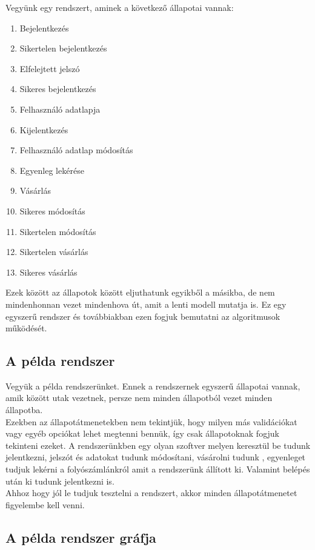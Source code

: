 \documentclass[12pt]{article}
\begin{document}
Vegyünk egy rendszert, aminek a következő állapotai vannak:
\begin{enumerate}
\item Bejelentkezés
\item Sikertelen bejelentkezés
\item Elfelejtett jelszó
\item Sikeres bejelentkezés
\item Felhasználó adatlapja
\item Kijelentkezés
\item Felhasználó adatlap módosítás
\item Egyenleg lekérése
\item Vásárlás
\item Sikeres módosítás
\item Sikertelen módosítás
\item Sikertelen vásárlás
\item Sikeres vásárlás
\end{enumerate}

Ezek között az állapotok között eljuthatunk egyikből a másikba, de nem mindenhonnan vezet mindenhova út, amit a lenti modell mutatja is.
Ez egy egyszerű rendszer és továbbiakban ezen fogjuk bemutatni az algoritmusok működését.\\

\subsection{A példa rendszer}

Vegyük a példa rendszerünket. Ennek a rendszernek egyszerű állapotai vannak, amik között utak vezetnek, persze nem minden állapotból vezet minden állapotba.\\
Ezekben az állapotátmenetekben nem tekintjük, hogy milyen más validációkat vagy egyéb opciókat lehet megtenni bennük, így csak állapotoknak fogjuk tekinteni ezeket.
A rendszerünkben egy olyan szoftver melyen keresztül be tudunk jelentkezni, jelszót és adatokat tudunk módosítani, vásárolni tudunk , egyenleget tudjuk lekérni a folyószámlánkról amit a rendszerünk állított ki. Valamint belépés után ki tudunk jelentkezni is.\\

Ahhoz hogy jól le tudjuk tesztelni a rendszert, akkor minden állapotátmenetet figyelembe kell venni.\\

\subsection{A példa rendszer gráfja}
\end{document}
